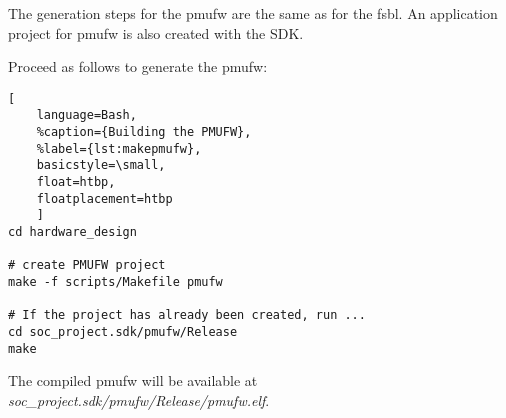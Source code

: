 The generation steps for the \gls{pmufw} are the same as for the \gls{fsbl}. An application project for \gls{pmufw} is also created with the SDK.

Proceed as follows to generate the \gls{pmufw}:
\begin{lstlisting}[
	language=Bash,
	%caption={Building the PMUFW},
	%label={lst:makepmufw},
	basicstyle=\small,
	float=htbp,
	floatplacement=htbp
	]
cd hardware_design

# create PMUFW project
make -f scripts/Makefile pmufw

# If the project has already been created, run ...
cd soc_project.sdk/pmufw/Release
make
\end{lstlisting}

The compiled \gls{pmufw} will be available at \emph{soc_project.sdk/pmufw/Release/pmufw.elf}.